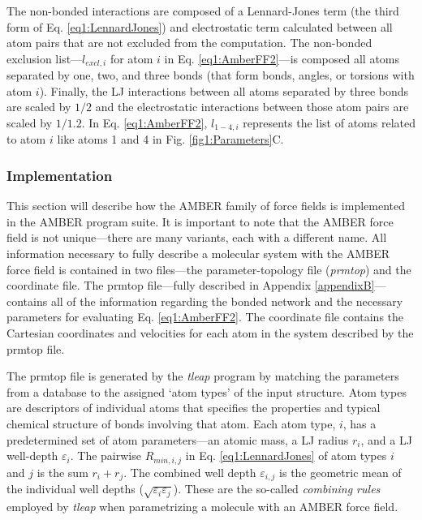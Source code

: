 The non-bonded interactions are composed of a Lennard-Jones term (the third form
of Eq. \ref{eq1:LennardJones}) and electrostatic term calculated between all
atom pairs that are not excluded from the computation. The non-bonded exclusion
list---$l_{excl,i}$ for atom $i$ in Eq. \ref{eq1:AmberFF2}---is composed all
atoms separated by one, two, and three bonds (\ie that form bonds, angles, or
torsions with atom $i$). Finally, the LJ interactions between all atoms
separated by three bonds are scaled by $1/2$ and the electrostatic interactions
between those atom pairs are scaled by $1/1.2$. In Eq. \ref{eq1:AmberFF2},
$l_{1-4,i}$ represents the list of atoms related to atom $i$ like atoms 1 and
4 in Fig. \ref{fig1:Parameters}C.

\subsubsection{Implementation}

This section will describe how the AMBER family of force fields is implemented
in the AMBER program suite. It is important to note that the AMBER force field
is not unique---there are many variants, each with a different name.
\cite{Cornell_JAmChemSoc_1995_v117_p5179, Wang_JComputChem_2000_v21_p1049,
Duan03, Wang_JComputChem_2004_v25_p1157, Hornak_Proteins_2006_v65_p712,
Zgarbova_JChemTheoryComput_2011_v7_p2886} All information necessary to fully
describe a molecular system with the AMBER force field is contained in two
files---the parameter-topology file (\emph{prmtop}) and the coordinate file. The
prmtop file---fully described in Appendix \ref{appendixB}---contains all of the
information regarding the bonded network and the necessary parameters for
evaluating Eq. \ref{eq1:AmberFF2}. The coordinate file contains the Cartesian
coordinates and velocities for each atom in the system described by the prmtop
file.

The prmtop file is generated by the \emph{tleap} program by matching the
parameters from a database to the assigned `atom types' of the input structure.
Atom types are descriptors of individual atoms that specifies the properties and
typical chemical structure of bonds involving that atom. Each atom type, $i$,
has a predetermined set of atom parameters---an atomic mass, a LJ radius $r_i$,
and a LJ well-depth $\varepsilon_i$. The pairwise $R_{min,i,j}$ in Eq.
\ref{eq1:LennardJones} of atom types $i$ and $j$ is the sum $r_i + r_j$. The
combined well depth $\varepsilon_{i,j}$ is the geometric mean of the individual
well depths ($\sqrt {\varepsilon_i \varepsilon_j}$). These are the so-called
\emph{combining rules} employed by \emph{tleap} when parametrizing a molecule
with an AMBER force field.

